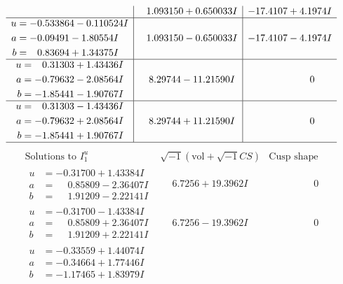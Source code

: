 \documentclass[1p]{elsarticle_modified}
\theoremstyle{definition}
\newcommand{\I}{\sqrt{-1}}
\begin{document}
$$\begin{array}{c|c|c}
 & \phantom{-}1.093150 + 0.650033 I & -17.4107 + 4.1974 I \\ \hline\begin{aligned}
u &= -0.533864 - 0.110524 I \\
a &= -0.09491 - 1.80554 I \\
b &= \phantom{-}0.83694 + 1.34375 I\end{aligned}
 & \phantom{-}1.093150 - 0.650033 I & -17.4107 - 4.1974 I \\ \hline\begin{aligned}
u &= \phantom{-}0.31303 + 1.43436 I \\
a &= -0.79632 - 2.08564 I \\
b &= -1.85441 - 1.90767 I\end{aligned}
 & \phantom{-}8.29744 - 11.21590 I & \phantom{-0.000000 } 0 \\ \hline\begin{aligned}
u &= \phantom{-}0.31303 - 1.43436 I \\
a &= -0.79632 + 2.08564 I \\
b &= -1.85441 + 1.90767 I\end{aligned}
 & \phantom{-}8.29744 + 11.21590 I & \phantom{-0.000000 } 0\\
 \hline 
 \end{array}$$\newpage$$\begin{array}{c|c|c}  
\text{Solutions to }I^u_{1}& \I (\text{vol} + \sqrt{-1}CS) & \text{Cusp shape}\\
 \hline 
\begin{aligned}
u &= -0.31700 + 1.43384 I \\
a &= \phantom{-}0.85809 - 2.36407 I \\
b &= \phantom{-}1.91209 - 2.22141 I\end{aligned}
 & \phantom{-}6.7256 + 19.3962 I & \phantom{-0.000000 } 0 \\ \hline\begin{aligned}
u &= -0.31700 - 1.43384 I \\
a &= \phantom{-}0.85809 + 2.36407 I \\
b &= \phantom{-}1.91209 + 2.22141 I\end{aligned}
 & \phantom{-}6.7256 - 19.3962 I & \phantom{-0.000000 } 0 \\ \hline\begin{aligned}
u &= -0.33559 + 1.44074 I \\
a &= -0.34664 + 1.77446 I \\
b &= -1.17465 + 1.83979 I\end{aligned}

\end{array}$$
\end{document}
